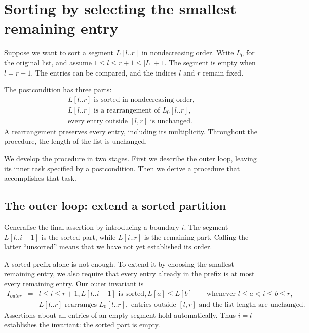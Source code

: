 \section{Sorting by selecting the smallest remaining entry}
\label{sec:imp-sort}

Suppose we want to sort a segment $L[l..r]$ in nondecreasing order.
Write $L_0$ for the original list, and assume
$1\leq l\leq r+1\leq |L|+1$. The segment is empty when $l=r+1$.
The entries can be compared, and the indices $l$ and $r$ remain fixed.

The postcondition has three parts:
\[
\begin{gathered}
L[l..r]\text{ is sorted in nondecreasing order},\\
L[l..r]\text{ is a rearrangement of }L_0[l..r],\\
\text{every entry outside }[l,r]\text{ is unchanged}.
\end{gathered}
\]
A rearrangement preserves every entry, including its multiplicity.
Throughout the procedure, the length of the list is unchanged.

We develop the procedure in two stages. First we describe the outer
loop, leaving its inner task specified by a postcondition. Then we
derive a procedure that accomplishes that task.

\subsection{The outer loop: extend a sorted partition}

Generalise the final assertion by introducing a boundary $i$.
The segment $L[l..i-1]$ is the sorted part, while $L[i..r]$ is the
remaining part. Calling the latter ``unsorted'' means that we have
not yet established its order.

A sorted prefix alone is not enough. To extend it by choosing the
smallest remaining entry, we also require that every entry already
in the prefix is at most every remaining entry. Our outer invariant is
\[
\begin{array}{lcl}
I_{outer} & = &l\leq i\leq r+1,
L[l..i-1]\text{ is sorted},
L[a]\leq L[b]\qquad
\text{whenever }l\leq a<i\leq b\leq r,\\
&&L[l..r]\text{ rearranges }L_0[l..r],
\text{ entries outside }[l,r]\text{ and the list length are unchanged}.
\end{array}
\]
Assertions about all entries of an empty segment hold automatically.
Thus $i=l$ establishes the invariant: the sorted part is empty.

